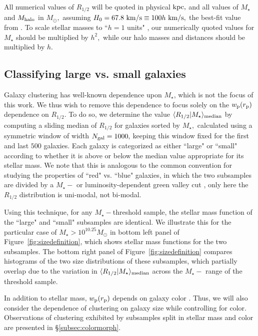 \documentclass[usenatbib,usegraphicx,letterpaper]{mn2e}
\newcommand{\rhalf}{R_{1/2}}
\newcommand{\mstar}{M_{\star}}
\newcommand{\mhalo}{M_{\rm halo}}
\newcommand{\rproj}{r_{\rm p}}
\newcommand{\wproj}{w_{\rm p}}
\newcommand{\median}[2]{\langle{#1}\vert{#2}\rangle_{\rm median}}
\newcommand{\kpc}{{\rm kpc}}
\newcommand{\msun}{M_\odot}
\newcommand{\kms}{{\rm km/s}}
\begin{document}
All numerical values of $\rhalf$ will be quoted in physical $\kpc,$ and all values of $\mstar$ and $\mhalo$ in $\msun,$ assuming $H_0=67.8~\kms\equiv100h~\kms,$ the best-fit value from \citet{planck15}. To scale stellar masses to ``$h=1$ units" \citep{croton13}, our numerically quoted values for $\mstar$ should be multiplied by $h^2,$ while our halo masses and distances should be multiplied by $h.$

\subsection{Classifying large vs. small galaxies}
\label{subsec:sizedef}

Galaxy clustering has well-known dependence upon $\mstar$, which is not the focus of this work.  We thus wish to remove this dependence to focus solely on the  $\wproj(\rproj)$ dependence
on $\rhalf.$ To do so, we determine the value $\median{\rhalf}{\mstar}$ by computing a sliding median of $\rhalf$ for galaxies sorted by $\mstar,$ calculated using a symmetric window of width $N_{\rm gal}=1000,$ keeping this window fixed for the first and last $500$ galaxies. Each galaxy is categorized as either ``large" or ``small" according to whether it is above or below the median value appropriate for its stellar mass. We note that this is analogous to the common convention for studying the properties of ``red" vs. ``blue" galaxies, in which the two subsamples are divided by a $\mstar-$ or luminosity-dependent green valley cut \citep[e.g.,][]{vdB_etal08,zehavi_etal11}, only here the $\rhalf$ distribution is uni-modal, not bi-modal.

Using this technique, for any $\mstar-$threshold sample, the stellar mass function of the ``large" and ``small" subsamples are identical. We illustrate this for the particular case of $\mstar>10^{10.25}\msun$ in bottom left panel of Figure~\ref{fig:sizedefinition}, which shows stellar mass functions for the two subsamples. The bottom right panel of Figure~\ref{fig:sizedefinition} compares histograms of the two size distributions of these subsamples, which partially overlap due to the variation in $\median{\rhalf}{\mstar}$ across the $\mstar-$ range of the threshold sample.

In addition to stellar mass, $\wproj(\rproj)$ depends on galaxy color \citep[e.g.,][]{zehavi_etal11}. Thus, we will also consider the
dependence of clustering on galaxy size while controlling for color. Observations of clustering exhibited by subsamples split in stellar mass and color are presented in \S\ref{subsec:colormorph}.
\end{document}
